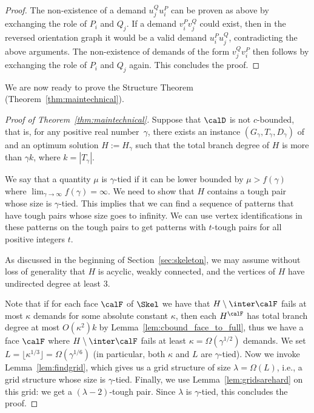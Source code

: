 \begin{proof}
The non-existence of a demand $u^Q_ju^P_i$ can be proven as above by exchanging the role of $P_i$ and $Q_j$. If a demand $v^P_iv^Q_j$ could exist, then in the reversed orientation graph it would be a valid demand $u^P_iu^Q_j$, contradicting the above arguments. The non-existence of demands of the form $v^Q_jv^P_i$ then follows by exchanging the role of $P_i$ and $Q_j$ again. This concludes the proof.
\end{proof}

We are now ready to prove the Structure Theorem (Theorem~\ref{thm:maintechnical}).

\begin{proof}[Proof of Theorem~\ref{thm:maintechnical}]
Suppose that $\calD$ is not $c$-bounded, that is, for any positive real number~$\gamma$, there exists an instance $(G_\gamma,T_\gamma,D_\gamma)$ of \Dsn and an optimum solution $H:=H_\gamma$ such that the total branch degree of $H$ is more than $\gamma k$, where $k = |T_\gamma|$.

We say that a quantity $\mu$ is $\gamma$-tied if it can be lower bounded by $\mu>f(\gamma)$ where $\lim_{\gamma \rightarrow \infty} f(\gamma)=\infty$. We need to show that $H$ contains a tough pair whose size is $\gamma$-tied. This implies that we can find a sequence of patterns that have tough pairs whose size goes to infinity. We can use vertex identifications in these patterns on the tough pairs to get patterns with $t$-tough pairs for all positive integers $t$.

As discussed in the beginning of Section~\ref{sec:skeleton}, we may assume without loss of generality that $H$ is acyclic, weakly connected, and the vertices of $H$ have undirected degree at least $3$.

Note that if for each face $\calF$ of $\Skel$ we have that $H\setminus \inter \calF$ fails at most $\kappa$ demands for some absolute constant $\kappa$, then each $H^\calF$ has total branch degree at most $O(\kappa^2)k$ by Lemma~\ref{lem:cbound_face_to_full}, thus we have a face $\calF$ where $H\setminus \inter \calF$ fails at least $\kappa=\Omega(\gamma^{1/2})$ demands. We set $L=\lfloor \kappa^{1/3}\rfloor =\Omega(\gamma^{1/6})$ (in particular, both $\kappa$ and $L$ are  $\gamma$-tied). Now we invoke Lemma~\ref{lem:findgrid}, which gives us a grid structure of size $\lambda=\Omega(L)$, i.e., a grid structure whose size is $\gamma$-tied. Finally, we use Lemma~\ref{lem:gridsarehard} on this grid: we get a $(\lambda-2)$-tough pair. Since $\lambda$ is $\gamma$-tied, this concludes the proof.
\end{proof}